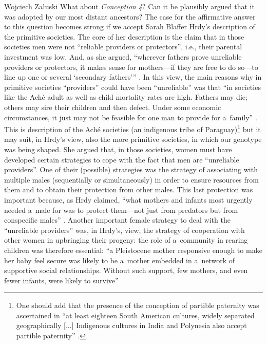 \begin{artengenv}{Wojciech Załuski}
What about \textit{Conception 4}? Can it be plausibly argued that it was adopted by our most distant ancestors? The case for the affirmative answer to this question becomes strong if we accept Sarah Blaffer Hrdy's description of the primitive societies. The core of her description is the claim that in those societies men were not ``reliable providers or protectors'', i.e., their parental investment was low. And, as she argued, ``wherever fathers prove unreliable providers or protectors, it makes sense for mothers---if they are free to do so---to line up one or several ‘secondary fathers'{''}
\parencite[][p.xxiii]{hrdy_woman_1999}. %
 In this view, the main reasons why in primitive societies ``providers'' could have been ``unreliable'' was that ``in societies like the Aché adult as well as child mortality rates are high. Fathers may die; others may sire their children and then defect. Under some economic circumstances, it just may not be feasible for one man to provide for a~family'' 
\parencite[][p.xxiii]{hrdy_woman_1999}. %
 This is description of the Aché societies (an indigenous tribe of Paraguay)\footnote{One should add that the presence of the conception of partible paternity was ascertained in ``at least eighteen South American cultures, widely separated geographically [...] Indigenous cultures in India and Polynesia also accept partible paternity'' 
\parencite[][p.70]{hubin_daddy_2003}.%
} but it may suit, in Hrdy's view, also the more primitive societies, in which our genotype was being shaped. She argued that, in those societies, women must have developed certain strategies to cope with the fact that men are ``unreliable providers''. One of their (possible) strategies was the strategy of associating with multiple males (sequentially or simultaneously) in order to ensure resources from them and to obtain their protection from other males. This last protection was important because, as Hrdy claimed, ``what mothers and infants most urgently needed a~male for was to protect them---not just from predators but from conspecific males'' 
\parencite[][p.148]{hrdy_mothers_2009}. %
 Another important female strategy to deal with the ``unreliable providers'' was, in Hrdy's, view, the strategy of cooperation with other women in upbringing their progeny: the role of a~community in rearing children was therefore essential: ``a Pleistocene mother responsive enough to make her baby feel secure was likely to be a~mother embedded in a~network of supportive social relationships. Without such support, few mothers, and even fewer infants, were likely to survive'' 

\end{artengenv}
